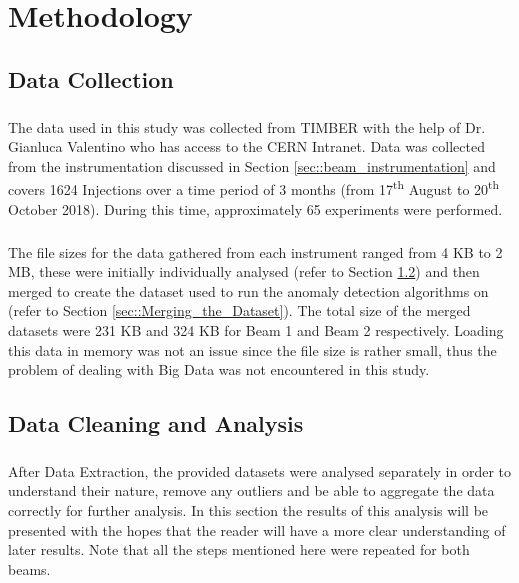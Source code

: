 \chapter{Methodology}

\section{Data Collection}
\paragraph{ }The data used in this study was collected from \ac{TIMBER} with the help of Dr. Gianluca Valentino who has access to the \acs{CERN} Intranet. Data was collected from the instrumentation discussed in Section \ref{sec::beam_instrumentation} and covers 1624 Injections over a time period of 3 months (from 17\textsuperscript{th} August to 20\textsuperscript{th} October 2018). During this time, approximately 65 experiments were performed.

\paragraph{ }The file sizes for the data gathered from each instrument ranged from 4 KB to 2 MB, these were initially individually analysed (refer to Section \ref{sec::Data_Cleaning_and_Analysis}) and then merged to create the dataset used to run the anomaly detection algorithms on (refer to Section \ref{sec::Merging_the_Dataset}). The total size of the merged datasets were 231 KB and 324 KB for Beam 1 and Beam 2 respectively. Loading this data in memory was not an issue since the file size is rather small, thus the problem of dealing with Big Data was not encountered in this study.

\section{Data Cleaning and Analysis}
\label{sec::Data_Cleaning_and_Analysis}
\paragraph{ }After Data Extraction, the provided datasets were analysed separately in order to understand their nature, remove any outliers and be able to aggregate the data correctly for further analysis. In this section the results of this analysis will be presented with the hopes that the reader will have a more clear understanding of later results. Note that all the steps mentioned here were repeated for both beams.

